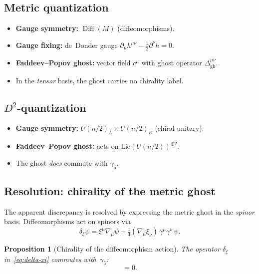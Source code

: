 \documentclass[12pt,a4paper]{article}
\newcommand{\half}{\tfrac{1}{2}}
\newcommand{\Diff}{\operatorname{Diff}}
\newtheorem{proposition}[theorem]{Proposition}
\theoremstyle{definition}
\theoremstyle{remark}
\begin{document}
\subsection{Metric quantization}

\begin{itemize}
  \item \textbf{Gauge symmetry:} $\Diff(M)$ (diffeomorphisms).
  \item \textbf{Gauge fixing:} de~Donder gauge
    $\partial_\mu h^{\mu\nu} - \half \partial^\nu h = 0$.
  \item \textbf{Faddeev--Popov ghost:} vector field $c^\mu$ with
    ghost operator $\Delta_{\mathrm{gh}}^{\mu\nu}$.
  \item In the \emph{tensor} basis, the ghost carries no chirality label.
\end{itemize}

\subsection{$D^2$-quantization}

\begin{itemize}
  \item \textbf{Gauge symmetry:} $U(n/2)_L \times U(n/2)_R$ (chiral unitary).
  \item \textbf{Faddeev--Popov ghost:} acts on
    $\mathrm{Lie}(U(n/2))^{\oplus 2}$.
  \item The ghost \emph{does} commute with $\gamma_5$.
\end{itemize}

\subsection{Resolution: chirality of the metric ghost}

The apparent discrepancy is resolved by expressing the metric ghost in
the \emph{spinor} basis.  Diffeomorphisms act on spinors via
\begin{equation}\label{eq:delta-xi}
  \delta_\xi \psi = \xi^\mu \nabla_\mu \psi
  + \tfrac{1}{4}(\nabla_\mu \xi_\nu)\,\gamma^\mu\gamma^\nu\,\psi.
\end{equation}

\begin{proposition}[Chirality of the diffeomorphism action]
\label{prop:ghost-chiral}
The operator $\delta_\xi$ in~\eqref{eq:delta-xi} commutes
with~$\gamma_5$:
\begin{equation}
  [\delta_\xi,\, \gamma_5] = 0.
\end{equation}
\end{proposition}
\end{document}
